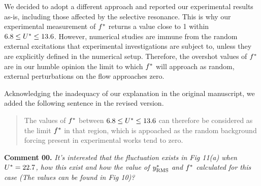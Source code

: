\documentclass[12pt]{article}
\newcounter{question}
\newcommand{\name}{00}
\newcommand{\question}[1]{\refstepcounter{question} \noindent \textbf{Comment \name.\thequestion}\vskip 0.25cm \noindent \emph{#1}\\}
\begin{document}
{  We decided to adopt a different approach and reported our experimental results as-is, including those affected by the selective resonance. This is why our experimental measurement of $f^{*}$ returns a value close to 1 within $6.8 \leq U^{*} \leq 13.6$. However, numerical studies are immune from the random external excitations that experimental investigations are subject to, unless they are explicitly defined in the numerical setup. Therefore, the overshot values of $f^{*}$ are in our humble opinion the limit to which $f^{*}$ will approach as random, external perturbations on the flow approaches zero.

  Acknowledging the inadequacy of our explanation in the original manuscript, we added the following sentence in the revised version.

  \begin{quotation}
    \color{blue}
    \noindent The values of $f^{*}$ between $6.8 \leq U^{*} \leq 13.6$ can therefore be considered as the limit $f^{*}$ in that region, which is appoached as the random background forcing present in experimental works tend to zero.
    \color{black}
  \end{quotation}

}

\question{It's interested that the fluctuation exists in Fig 11(a) when $U^{*} = 22.7$, how this exist and how the value of $y^{*}_{\text{RMS}}$ and $f^{*}$ calculated for this case (The values can be found in Fig 10)?}
\end{document}
